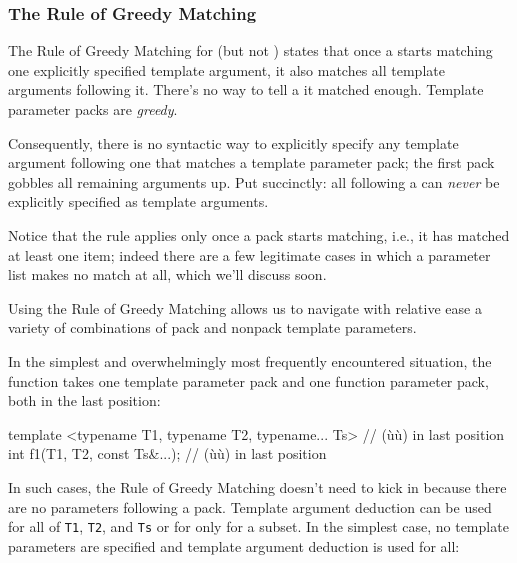 \subsubsection[The Rule of Greedy Matching]{The Rule of Greedy Matching}\label{the-rule-of-greedy-matching}

The Rule of Greedy Matching for  (but
not ) states that once a
 starts matching one explicitly
specified template argument, it also matches all template arguments
following it. There's no way to tell a 
it matched enough. Template parameter packs are \emph{greedy}.

Consequently, there is no syntactic way to explicitly specify any
template argument following one that matches a template parameter pack;
the first pack gobbles all remaining arguments up. Put succinctly: all
 following a  can \emph{never} be explicitly specified as template arguments.

Notice that the rule applies only once a pack starts matching, i.e., it
has matched at least one item; indeed there are a few legitimate cases
in which a parameter list makes no match at all, which we'll discuss
soon.

Using the Rule of Greedy Matching allows us to navigate with relative
ease a variety of combinations of pack and nonpack template parameters.

In the simplest and overwhelmingly most frequently encountered
situation, the function takes one template parameter pack and one
function parameter pack, both in the last position:

\begin{emcppslisting}[emcppsbatch=e17]
template <typename T1, typename T2, typename... Ts>  // (ù{}ù) in last position
int f1(T1, T2, const Ts&...);                        // (ù{}ù) in last position
\end{emcppslisting}
    

\noindent In such cases, the Rule of Greedy Matching doesn't need to kick in
because there are no parameters following a pack. Template argument
deduction can be used for all of \lstinline!T1!, \lstinline!T2!, and
\lstinline!Ts! or for only for a subset. In the simplest case, no template
parameters are specified and template argument deduction is used for
all:


